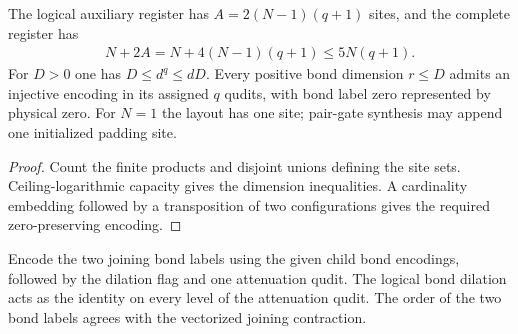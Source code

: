 \begin{lemma}
    \label{thm:mpu_common_register_layout}
    \leanok
    The logical auxiliary register has $A=2(N-1)(q+1)$ sites,
    and the complete register has
    \begin{align}
        N+2A=N+4(N-1)(q+1)\leq5N(q+1).
    \end{align}
    For $D>0$ one has $D\leq d^q\leq dD$. Every positive bond
    dimension $r\leq D$ admits an injective encoding in its assigned
    $q$ qudits, with bond label zero represented by physical zero.
    For $N=1$ the layout has one site; pair-gate synthesis may append
    one initialized padding site.
\end{lemma}
\begin{proof}\leanok
    Count the finite products and disjoint unions defining the site
    sets. Ceiling-logarithmic capacity gives the dimension inequalities.
    A cardinality embedding followed by a transposition of two
    configurations gives the required zero-preserving encoding.
\end{proof}

\begin{definition}
    \label{def:mpu_compatible_bond_dilation}
    \leanok
    Encode the two joining bond labels using the given child bond
    encodings, followed by the dilation flag and one attenuation
    qudit. The logical bond dilation acts as the identity on every
    level of the attenuation qudit. The order of the two bond labels
    agrees with the vectorized joining contraction.
\end{definition}

